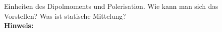 \begin{question}[section=2,subsection=22,name={Mikroskopischer Ursprung von elektrischer und magnetischer Polerisation},difficulty=3,type=mdl,tags={}]
	Einheiten des Dipolmoments und Polerisation. Wie kann man sich das Vorstellen? Was ist statische Mittelung?
	\\ \textbf{Hinweis:}\\
	
\end{question}
\begin{solution}
	
\end{solution}
